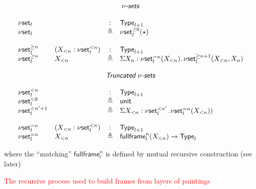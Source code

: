 \documentclass[12pt,landscape]{article}
\newcommand{\sort}[1]{\mathsf{Type}_{#1}}
\newcommand{\defeq}{\triangleq}
\newcommand{\partialcubset}[2]{\mathsf{\nu set}_{#1}^{<#2}}
\newcommand{\mycubset}[1]{\mathsf{\nu set}_{#1}}
\newcommand{\mycubsetfrom}[2]{\mathsf{\nu set}_{#1}^{\geq#2}}
\newcommand{\mycubsetcomp}[2]{\mathsf{\nu set}_{#1}^{=#2}}
\newcommand{\myfullbox}[1]{\mathsf{fullframe}_{#1}}
\newcommand{\unittype}{\mathsf{unit}}
\begin{document}
\begin{LARGE}
\begin{sf}
$$
\begin{array}{llcl}
\multicolumn{4}{c}{\mbox{\textsf{\textit{$\nu$-sets}}}}\\
\\
\mycubset{l} && : & \sort{l+1}\\
\mycubset{l} && \defeq & \mycubsetfrom{l}{0}(\star)\\
\\
\mycubsetfrom{l}{n} & (X_{<n}:\partialcubset{l}{n}) & : & \sort{l+1}\\
\mycubsetfrom{l}{n} & X_{<n} & \defeq & \Sigma X_n:\mycubsetcomp{l}{n}(X_{<n}).\,\mycubsetfrom{l}{n+1}(X_{<n},X_n)\\
\\
\multicolumn{4}{c}{\mbox{\textsf{\textit{Truncated $\nu$-sets}}}}\\
\\
\partialcubset{l}{n} && : & \sort{l+1}\\
\partialcubset{l}{0} && \defeq & \unittype\\
\partialcubset{l}{n'+1} && \defeq & \Sigma X_{<n}:\partialcubset{l}{n'}.\,\mycubsetcomp{l}{n}(X_{<n}))\\
\\
\mycubsetcomp{l}{n} & (X_{<n}:\partialcubset{l}{n}) & : & \sort{l+1}\\
\mycubsetcomp{l}{n} & X_{<n} & \defeq & \myfullbox{l}^{n}(X_{<n})\rightarrow \sort{l}\\
\end{array}
$$
\bigskip

\noindent where the ``matching'' $\myfullbox{l}^{n}$ is defined by mutual
recursive construction (see later)

\newpage

\begin{center}
\textcolor{red}{\huge The recursive process used to build frames from layers of paintings}
\end{center}

\bigskip
\bigskip


\end{sf}
\end{LARGE}
\end{document}
